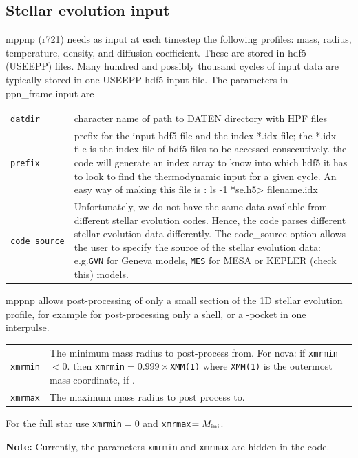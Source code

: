 \subsection{Stellar evolution input}
mppnp (r721) needs as input at each timestep the following profiles:
mass, radius, temperature, density, and diffusion coefficient. These
are stored in hdf5 (USEEPP) files. Many hundred and possibly thousand
cycles of input data are typically stored in one USEEPP hdf5 input
file. The parameters in ppn\_frame.input are\\
\begin{tabularx}{0.9\textwidth}{lX}
\texttt{datdir} & character name of path to DATEN directory with
  HPF files
\\
 \texttt{prefix} & prefix for the input hdf5 file and the index
  *.idx file; the *.idx file is the index file of hdf5 files to be
  accessed consecutively. the code will generate an index array to
  know into which hdf5 it has to look to find the thermodynamic input
  for a given cycle. An easy way of making this file is :
  ls -1 *se.h5> filename.idx

\\
\texttt{code\_source} & Unfortunately, we 
do not have the same data available from different stellar evolution 
codes.  Hence, the code parses different stellar evolution data 
differently.  The code\_source option allows the user to specify 
the source of the stellar evolution data:  e.g.\texttt{GVN} for 
Geneva models, \texttt{MES} for MESA or KEPLER (check this) models.  
\end{tabularx}

mppnp allows post-processing of only a small section of the 1D stellar
evolution profile, for example for post-processing only a shell, or a
\cdr-pocket in one interpulse.
\begin{tabularx}{0.9\textwidth}{lX}
\texttt{xmrmin} & The minimum mass radius to post-process from. For
                  nova: if \texttt{xmrmin} $< 0.$ then
                  \texttt{xmrmin}$=0.999\times$\texttt{XMM(1)} where \texttt{XMM(1)} is
                  the outermost mass coordinate, if . 
\\ \texttt{xmrmax} & The maximum
mass radius to post process to.
\end{tabularx}

For the full star use \texttt{xmrmin}$=0$ and
\texttt{xmrmax}$=M_{\mathrm{ ini}}$.

{\bf Note:} Currently, the parameters \texttt{xmrmin} and \texttt{xmrmax} are hidden in the code.


